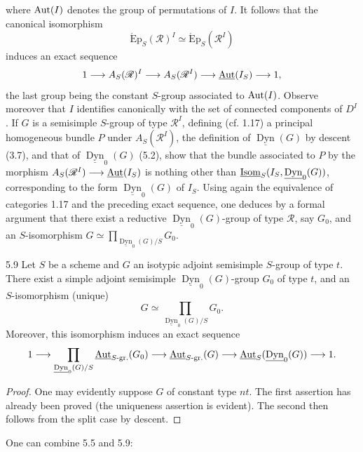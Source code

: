 where $\operatorname{Aut}(I)$ denotes the group of permutations of $I$. It follows that the canonical isomorphism
\[
\operatorname{\acute Ep}_S(\mathscr R)^I\simeq\operatorname{\acute Ep}_S(\mathscr R^I)
\]
induces an exact sequence
\[
1\longrightarrow A_S(\mathscr R)^I\longrightarrow A_S(\mathscr R^I)\longrightarrow\underline{\operatorname{Aut}}(I_S)\longrightarrow1,
\]
the last group being the constant $S$-group associated to $\operatorname{Aut}(I)$. Observe moreover that $I$ identifies canonically with the set of connected components of $D^I$.
If $G$ is a semisimple $S$-group of type $\mathscr R^I$, defining (cf. 1.17) a principal homogeneous bundle $P$ under $A_S(\mathscr R^I)$, the definition of $\underline{\operatorname{Dyn}}(G)$ by descent (3.7), and that of $\underline{\operatorname{Dyn}}_0(G)$ (5.2), show that the bundle associated to $P$ by the morphism $A_S(\mathscr R^I)\longrightarrow\underline{\operatorname{Aut}}(I_S)$ is nothing other than $\underline{\operatorname{Isom}}_S(I_S,\underline{\operatorname{Dyn}}_0(G))$, corresponding to the form $\underline{\operatorname{Dyn}}_0(G)$ of $I_S$. Using again the equivalence of categories 1.17 and the preceding exact sequence, one deduces by a formal argument that there exist a reductive $\underline{\operatorname{Dyn}}_0(G)$-group of type $\mathscr R$, say $G_0$, and an $S$-isomorphism $G\simeq\prod_{\underline{\operatorname{Dyn}}_0(G)/S}G_0$.
\begin{proposition}{5.9}\label{XXIV.5.9}
Let $S$ be a scheme and $G$ an isotypic adjoint semisimple $S$-group of type $t$. There exist a simple adjoint semisimple $\underline{\operatorname{Dyn}}_0(G)$-group $G_0$ of type $t$, and an $S$-isomorphism (unique)
\[
G\simeq\prod_{\underline{\operatorname{Dyn}}_0(G)/S}G_0.
\]
Moreover, this isomorphism induces an exact sequence
\[
1\longrightarrow\prod_{\underline{\operatorname{Dyn}}_0(G)/S}\underline{\operatorname{Aut}}_{S\text{-gr.}}(G_0)
\longrightarrow\underline{\operatorname{Aut}}_{S\text{-gr.}}(G)\longrightarrow\underline{\operatorname{Aut}}_S(\underline{\operatorname{Dyn}}_0(G))\longrightarrow1.
\]
\end{proposition}
\begin{proof}
One may evidently suppose $G$ of constant type $nt$. The first assertion has already been proved (the uniqueness assertion is evident). The second then follows from the split case by descent.
\end{proof}
One can combine 5.5 and 5.9:
